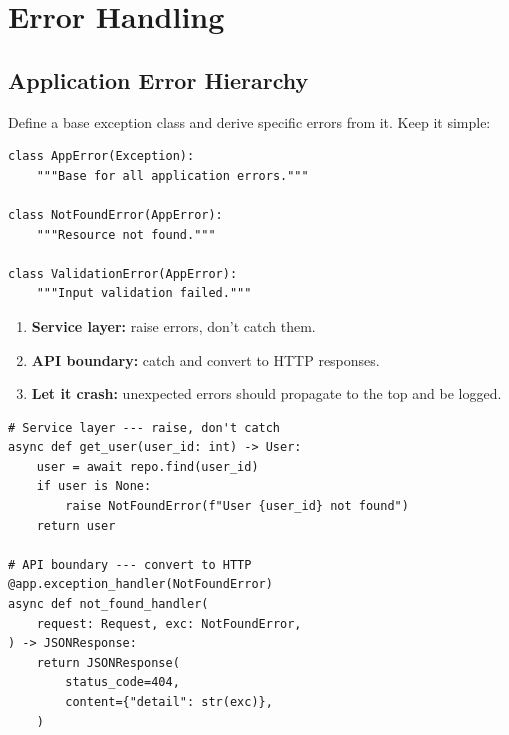 \documentclass[11pt,a4paper,oneside]{book}
\begin{document}
\chapter{Error Handling}

\section{Application Error Hierarchy}

Define a base exception class and derive specific errors from it. Keep it simple:

\begin{lstlisting}[style=python]
class AppError(Exception):
    """Base for all application errors."""

class NotFoundError(AppError):
    """Resource not found."""

class ValidationError(AppError):
    """Input validation failed."""
\end{lstlisting}

\begin{successbox}[title={Error propagation strategy}]
\begin{enumerate}
    \item \textbf{Service layer:} raise errors, don't catch them.
    \item \textbf{API boundary:} catch and convert to HTTP responses.
    \item \textbf{Let it crash:} unexpected errors should propagate to the top and be logged.
\end{enumerate}
\end{successbox}

\begin{lstlisting}[style=python]
# Service layer --- raise, don't catch
async def get_user(user_id: int) -> User:
    user = await repo.find(user_id)
    if user is None:
        raise NotFoundError(f"User {user_id} not found")
    return user

# API boundary --- convert to HTTP
@app.exception_handler(NotFoundError)
async def not_found_handler(
    request: Request, exc: NotFoundError,
) -> JSONResponse:
    return JSONResponse(
        status_code=404,
        content={"detail": str(exc)},
    )
\end{lstlisting}
\end{document}
